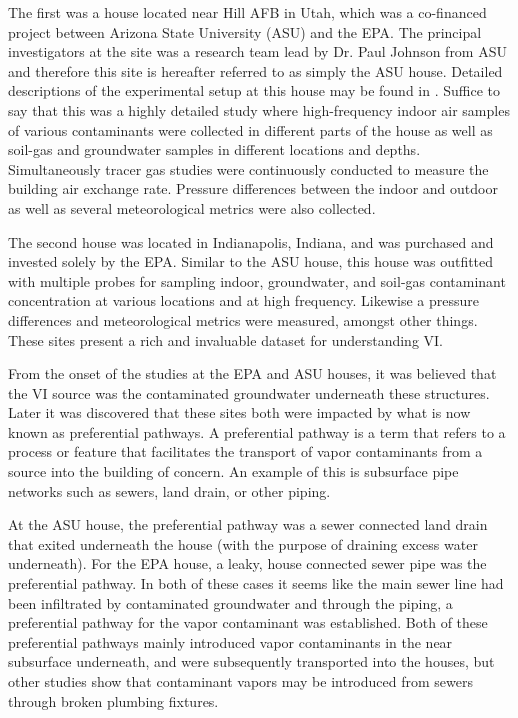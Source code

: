 \documentclass[../thesis.tex]{subfiles}
\begin{document}
The first was a house located near Hill AFB in Utah, which was a co-financed project between Arizona State University (ASU) and the EPA.
The principal investigators at the site was a research team lead by Dr. Paul Johnson from ASU and therefore this site is hereafter referred to as simply the ASU house.
Detailed descriptions of the experimental setup at this house may be found in .%
Suffice to say that this was a highly detailed study where high-frequency indoor air samples of various contaminants were collected in different parts of the house as well as soil-gas and groundwater samples in different locations and depths.
Simultaneously tracer gas studies were continuously conducted to measure the building air exchange rate.
Pressure differences between the indoor and outdoor as well as several meteorological metrics were also collected.\par

The second house was located in Indianapolis, Indiana, and was purchased and invested solely by the EPA.
Similar to the ASU house, this house was outfitted with multiple probes for sampling indoor, groundwater, and soil-gas contaminant concentration at various locations and at high frequency.
Likewise a pressure differences and meteorological metrics were measured, amongst other things.
These sites present a rich and invaluable dataset for understanding VI.\par

From the onset of the studies at the EPA and ASU houses, it was believed that the VI source was the contaminated groundwater underneath these structures.
Later it was discovered that these sites both were impacted by what is now known as preferential pathways.
A preferential pathway is a term that refers to a process or feature that facilitates the transport of vapor contaminants from a source into the building of concern.
An example of this is subsurface pipe networks such as sewers, land drain, or other piping.\par

At the ASU house, the preferential pathway was a sewer connected land drain that exited underneath the house (with the purpose of draining excess water underneath)\cite{guo_identification_2015}.
For the EPA house, a leaky, house connected sewer pipe was the preferential pathway\cite{mchugh_evidence_2017}.
In both of these cases it seems like the main sewer line had been infiltrated by contaminated groundwater and through the piping, a preferential pathway for the vapor contaminant was established.
Both of these preferential pathways mainly introduced vapor contaminants in the near subsurface underneath, and were subsequently transported into the houses, but other studies show that contaminant vapors may be introduced from sewers through broken plumbing fixtures\cite{pennell_sewer_2013,nielsen_remediation_2017}.
\end{document}
